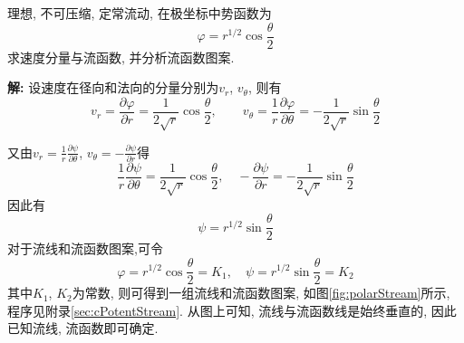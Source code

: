 \begin{problem}[问题6.2]
理想, 不可压缩, 定常流动, 在极坐标中势函数为
\[
\varphi = r^{1/2}\cos\frac{\theta}{2}
\]
求速度分量与流函数, 并分析流函数图案.
\end{problem}
\begin{solution}
\textbf{解:} 设速度在径向和法向的分量分别为$v_r$, $v_\theta$, 则有
\[
v_r = \frac{\partial \varphi}{\partial r} =\frac{1}{2\sqrt{r}}\cos\frac{\theta}{2}
,\qquad
v_\theta = \frac{1}{r}\frac{\partial \varphi}{\partial\theta} = -\frac{1}{2\sqrt{r}}\sin\frac{\theta}{2}
\]
\vspace{-1.5em}

\begin{multicols}{2}
\noindent 又由$v_r=\frac{1}{r}\frac{\partial\psi}{\partial \theta}$,
 $v_\theta=-\frac{\partial\psi}{\partial r}$得
\[
\frac{1}{r}\frac{\partial\psi}{\partial \theta}= \frac{1}{2\sqrt{r}}\cos\frac{\theta}{2}
,\quad
-\frac{\partial\psi}{\partial r}=-\frac{1}{2\sqrt{r}}\sin\frac{\theta}{2}
\]
\noindent 因此有
\[
\psi = r^{1/2}\sin\frac{\theta}{2}
\]
对于流线和流函数图案,可令
\[
\varphi = r^{1/2}\cos\frac{\theta}{2}=K_1,\quad
\psi = r^{1/2}\sin\frac{\theta}{2}=K_2
\]
其中$K_1$, $K_2$为常数, 则可得到一组流线和流函数图案, 如图\ref{fig:polarStream}所示, 程序见附录\ref{sec:cPotentStream}. 从图上可知, 流线与流函数线是始终垂直的, 因此已知流线, 流函数即可确定.

\vspace{2em}

\begin{center}

\label{fig:polarStream}
\end{center}
\end{multicols}
\end{solution}
